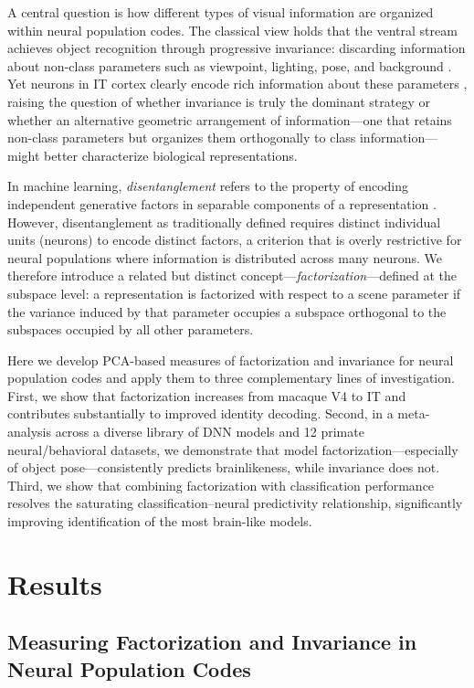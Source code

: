 \documentclass[11pt]{article}
\begin{document}
A central question is how different types of visual information are organized within neural population codes. The classical view holds that the ventral stream achieves object recognition through progressive invariance: discarding information about non-class parameters such as viewpoint, lighting, pose, and background \citep{rust2010selectivity}. Yet neurons in IT cortex clearly encode rich information about these parameters \citep{hong2016explicit}, raising the question of whether invariance is truly the dominant strategy or whether an alternative geometric arrangement of information---one that retains non-class parameters but organizes them orthogonally to class information---might better characterize biological representations.

In machine learning, \textit{disentanglement} refers to the property of encoding independent generative factors in separable components of a representation \citep{bengio2013representation, higgins2018towards}. However, disentanglement as traditionally defined requires distinct individual units (neurons) to encode distinct factors, a criterion that is overly restrictive for neural populations where information is distributed across many neurons. We therefore introduce a related but distinct concept---\textit{factorization}---defined at the subspace level: a representation is factorized with respect to a scene parameter if the variance induced by that parameter occupies a subspace orthogonal to the subspaces occupied by all other parameters.

Here we develop PCA-based measures of factorization and invariance for neural population codes and apply them to three complementary lines of investigation. First, we show that factorization increases from macaque V4 to IT and contributes substantially to improved identity decoding. Second, in a meta-analysis across a diverse library of DNN models and 12 primate neural/behavioral datasets, we demonstrate that model factorization---especially of object pose---consistently predicts brainlikeness, while invariance does not. Third, we show that combining factorization with classification performance resolves the saturating classification--neural predictivity relationship, significantly improving identification of the most brain-like models.

\section{Results}

\subsection{Measuring Factorization and Invariance in Neural Population Codes}
\end{document}
